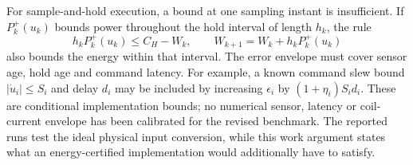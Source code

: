 For sample-and-hold execution, a bound at one sampling instant is
insufficient. If $P_k^+(u_k)$ bounds power throughout the hold interval
of length $h_k$, the rule
\begin{equation}
 h_kP_k^+(u_k)\le C_H-W_k,\qquad
 W_{k+1}=W_k+h_kP_k^+(u_k)
 \label{sm:discrete-work}
\end{equation}
also bounds the energy within that interval. The error envelope must
cover sensor age, hold age and command latency. For example, a known
command slew bound $|\dot u_i|\le S_i$ and delay $d_i$ may be included
by increasing $\epsilon_i$ by $(1+\eta_i)S_id_i$.
These are conditional implementation bounds; no numerical sensor,
latency or coil-current envelope has been calibrated for the revised
benchmark. The reported runs test the ideal physical input conversion,
while this work argument states what an energy-certified implementation
would additionally have to satisfy.
